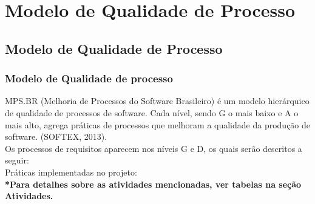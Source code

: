 \part{Modelo de Qualidade de Processo}
\chapter[Modelo de Qualidade de Processo]{Modelo de Qualidade de Processo}
{\large {\section { Modelo de Qualidade de processo \\ } } }
{MPS.BR (Melhoria de Processos do Software Brasileiro) é um modelo hierárquico de qualidade de
processos de software. Cada nível, sendo G o mais baixo e A o mais alto, agrega práticas de processos que
melhoram a qualidade da produção de software. (SOFTEX, 2013).\\
Os processos de requisitos aparecem nos níveis G e D, os quais serão descritos a seguir:\\
}
{\large Práticas implementadas no projeto:\\}
{\footnotesize {\textbf { *Para detalhes sobre as atividades mencionadas, ver tabelas na seção Atividades. \\ }}}

